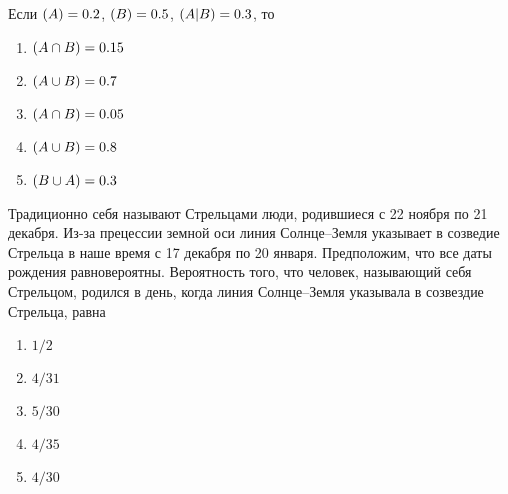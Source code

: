 \documentclass[t]{beamer}
\let\P\relax
\DeclareMathOperator{\P}{\mathbb{P}}
\begin{document}
 \begin{frame} \label{5} 
\begin{block}{5} 

  Если $\P(A)=0.2$, $\P(B)=0.5$, $\P(A | B) = 0.3$, то
  


 \end{block} 
\begin{enumerate} 
\item[] \hyperlink{5-Yes}{\beamergotobutton{} $\P(A \cap B) = 0.15$}
\item[] \hyperlink{5-No}{\beamergotobutton{} $\P(A \cup B) = 0.7$}
\item[] \hyperlink{5-No}{\beamergotobutton{} $\P(A \cap B) = 0.05$}
\item[] \hyperlink{5-No}{\beamergotobutton{} $\P(A \cup B) = 0.8$}
\item[] \hyperlink{5-No}{\beamergotobutton{} $\P(B \cup A) = 0.3$}
\end{enumerate} 
\end{frame} 


 \begin{frame} \label{6} 
\begin{block}{6} 

  Традиционно себя называют Стрельцами люди, родившиеся с 22 ноября по 21 декабря. Из-за прецессии земной оси линия Солнце–Земля указывает в созведие Стрельца в наше время с 17 декабря по 20 января. Предположим, что все даты рождения равновероятны. Вероятность того, что человек, называющий себя Стрельцом, родился в день, когда линия Солнце–Земля указывала в созвездие Стрельца, равна
  


 \end{block} 
\begin{enumerate} 
\item[] \hyperlink{6-No}{\beamergotobutton{} $1/2$}
\item[] \hyperlink{6-No}{\beamergotobutton{} $4/31$}
\item[] \hyperlink{6-Yes}{\beamergotobutton{} $5/30$}
\item[] \hyperlink{6-No}{\beamergotobutton{} $4/35$}
\item[] \hyperlink{6-No}{\beamergotobutton{} $4/30$}
\end{enumerate} 
\end{frame} 
\end{document}
